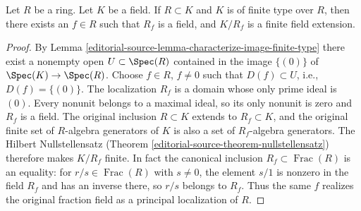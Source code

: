 \begin{lemma}
\label{editorial-source-lemma-field-finite-type-over-domain}
Let $R$ be a ring. Let $K$ be a field.
If $R \subset K$ and $K$ is of finite type over $R$,
then there exists an $f \in R$ such that $R_f$ is a field,
and $K/R_f$ is a finite field extension.
\end{lemma}

\begin{proof}
By Lemma \ref{editorial-source-lemma-characterize-image-finite-type} there
exist a nonempty open $U \subset \Spec(R)$
contained in the image $\{(0)\}$ of $\Spec(K) \to \Spec(R)$.
Choose $f \in R$, $f \not = 0$ such that $D(f) \subset U$, i.e.,
$D(f)=\{(0)\}$. The localization $R_f$ is a domain whose only
prime ideal is $(0)$. Every nonunit belongs to a maximal ideal,
so its only nonunit is zero and $R_f$ is a field. The original
inclusion $R\subset K$ extends to $R_f\subset K$, and the original
finite set of $R$-algebra generators of $K$ is also a set of
$R_f$-algebra generators. The Hilbert Nullstellensatz
(Theorem \ref{editorial-source-theorem-nullstellensatz}) therefore makes $K/R_f$ finite.
In fact the canonical inclusion $R_f\subset\operatorname{Frac}(R)$
is an equality: for $r/s\in\operatorname{Frac}(R)$ with $s\ne0$,
the element $s/1$ is nonzero in the field $R_f$ and has an inverse
there, so $r/s$ belongs to $R_f$. Thus the same $f$ realizes the
original fraction field as a principal localization of $R$.
\end{proof}